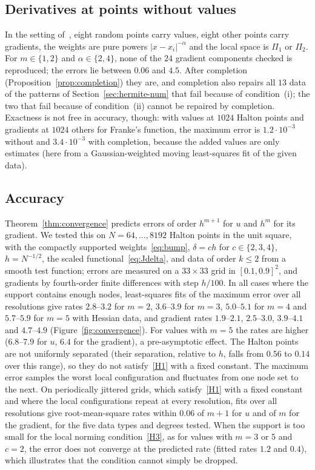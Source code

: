 \documentclass[12pt]{amsart}
\theoremstyle{definition}
\theoremstyle{remark}
\begin{document}
\subsection{Derivatives at points without values}\label{sec:kl-num}
In the setting of~\cite[\S3]{KomargodskiLevin2006}, eight random points carry values, eight
other points carry gradients, the weights are pure powers $|x-x_i|^{-\alpha}$ and the local space is
$\Pi_1$ or $\Pi_2$. For $m\in\{1,2\}$ and $\alpha\in\{2,4\}$, none of the $24$ gradient
components checked is reproduced; the errors lie between $0.06$ and $4.5$. After completion
(Proposition~\ref{prop:completion}) they are, and completion also repairs all $13$ data of the
patterns of Section~\ref{sec:hermite-num} that fail because of condition~(i); the two that fail
because of condition~(ii) cannot be repaired by completion. Exactness is not free in
accuracy, though: with values at $1024$ Halton points and gradients at $1024$ others for
Franke's function, the maximum error is $1.2\cdot10^{-3}$ without and $3.4\cdot10^{-3}$ with
completion, because the added values are only estimates (here from a Gaussian-weighted moving
least-squares fit of the given data).

\subsection{Accuracy}\label{sec:convergence}
Theorem~\ref{thm:convergence} predicts errors of order $h^{m+1}$ for $u$ and $h^m$ for its
gradient. We tested this on $N=64,\dots,8192$ Halton points in the unit square, with the
compactly supported weights~\eqref{eq:bump}, $\delta=ch$ for $c\in\{2,3,4\}$, $h=N^{-1/2}$,
the scaled functional~\eqref{eq:Jdelta}, and data of order $k\le2$ from a smooth test
function; errors are measured on a $33\times33$ grid in $[0.1,0.9]^2$, and gradients by
fourth-order finite differences with step $h/100$. In all cases where the support contains
enough nodes, least-squares fits of the maximum error over all resolutions give rates
$2.8$--$3.2$ for $m=2$, $3.6$--$3.9$ for $m=3$, $5.0$--$5.1$ for $m=4$ and $5.7$--$5.9$ for
$m=5$ with Hessian data, and gradient rates $1.9$--$2.1$, $2.5$--$3.0$, $3.9$--$4.1$ and
$4.7$--$4.9$ (Figure~\ref{fig:convergence}). For values with $m=5$ the rates are higher
($6.8$--$7.9$ for $u$, $6.4$ for the gradient), a pre-asymptotic effect. The Halton points are
not uniformly separated (their separation, relative to $h$, falls from $0.56$ to $0.14$ over
this range), so they do not satisfy~\ref{H1} with a fixed constant. The maximum error samples the worst local
configuration and fluctuates from one node set to the next. On periodically jittered grids, which
satisfy~\ref{H1} with a fixed constant and
where the local configurations repeat at every resolution, fits over all resolutions give
root-mean-square rates within $0.06$ of $m+1$ for $u$ and of $m$ for the gradient, for the
five data types and degrees tested. When the support is too small for the local
norming condition~\ref{H3}, as for values with $m=3$ or $5$ and $c=2$, the error does not
converge at the predicted rate (fitted rates $1.2$ and $0.4$), which illustrates that the
condition cannot simply be dropped.
\end{document}
